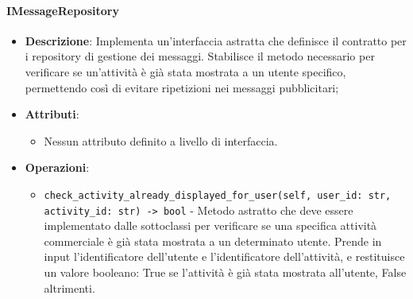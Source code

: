 \documentclass[10pt]{article}
\begin{document}
    \paragraph{IMessageRepository}
    \begin{itemize} 
    \item \textbf{Descrizione}: Implementa un'interfaccia astratta che definisce il contratto per i repository di gestione dei messaggi. Stabilisce il metodo necessario per verificare se un'attività è già stata mostrata a un utente specifico, permettendo così di evitare ripetizioni nei messaggi pubblicitari;
    \item \textbf{Attributi}:
    \begin{itemize}
        \item Nessun attributo definito a livello di interfaccia.
    \end{itemize}
    
    \item \textbf{Operazioni}:
    \begin{itemize}
        \item \texttt{check\_activity\_already\_displayed\_for\_user(self, user\_id: str, activity\_id: str) -> bool} - Metodo astratto che deve essere implementato dalle sottoclassi per verificare se una specifica attività commerciale è già stata mostrata a un determinato utente. Prende in input l'identificatore dell'utente e l'identificatore dell'attività, e restituisce un valore booleano: True se l'attività è già stata mostrata all'utente, False altrimenti.
    \end{itemize}
    \end{itemize}
\end{document}
